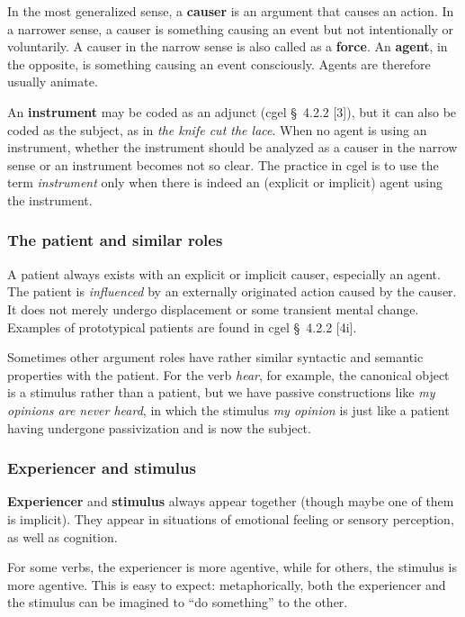 \documentclass{article}
\newcommand*{\citesec}[1]{\S~{#1}}
\newcommand*{\concept}[1]{\textbf{#1}}
\newcommand*{\term}[1]{\emph{#1}}
\newcommand*{\corpus}[1]{\emph{#1}}
\begin{document}
In the most generalized sense,
a \concept{causer} is an argument that causes an action. 
In a narrower sense, a causer is something causing an event but not intentionally or voluntarily.
A causer in the narrow sense is also called as a \concept{force}.
An \concept{agent}, in the opposite, is something causing an event consciously.
Agents are therefore usually animate.

An \concept{instrument} may be coded as an adjunct (\ac{cgel} \citesec{4.2.2} [3]),
but it can also be coded as the subject, 
as in \corpus{the knife cut the lace}.
When no agent is using an instrument, 
whether the instrument should be analyzed as a causer in the narrow sense or an instrument
becomes not so clear.
The practice in \ac{cgel} is to use the term \term{instrument} only when 
there is indeed an (explicit or implicit) agent using the instrument.

\subsubsection{The patient and similar roles}

A patient always exists with an explicit or implicit causer, especially an agent.
The patient is \emph{influenced} by an externally originated action caused by the causer.
It does not merely undergo displacement or some transient mental change. 
Examples of prototypical patients are found in \ac{cgel} \citesec{4.2.2} [4i].

Sometimes other argument roles have rather similar syntactic and semantic properties with the patient.
For the verb \corpus{hear}, for example,
the canonical object is a stimulus rather than a patient,
but we have passive constructions like \corpus{my opinions are never heard},
in which the stimulus \corpus{my opinion} is just like 
a patient having undergone passivization and is now the subject.

\subsubsection{Experiencer and stimulus}

\concept{Experiencer} and \concept{stimulus} always appear together (though maybe one of them is implicit).
They appear in situations of emotional feeling or sensory perception, as well as cognition.

For some verbs, the experiencer is more agentive, while for others, the stimulus is more agentive.
This is easy to expect:
metaphorically, both the experiencer and the stimulus can be imagined to ``do something'' to the other.
\end{document}
